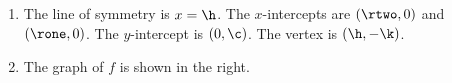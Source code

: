\begin{solution}

\begin{minipage}{\textwidth}
\begin{minipage}{0.6\textwidth}
\begin{enumerate}[label={(\arabic*)},afterlabel=\quad]
\item
 The line of symmetry is $x=\h$. The $x$-intercepts are $(\rtwo, 0)$ and $(\rone,0)$. The $y$-intercept is $(0, \c)$. The vertex is $(\h, -\k)$.
\item The graph of $f$ is shown in the right.
\end{enumerate}
\end{minipage}
\begin{minipage}{0.4\textwidth}
\begin{center}
\end{center}
\end{minipage}
\end{minipage}
\end{solution}

